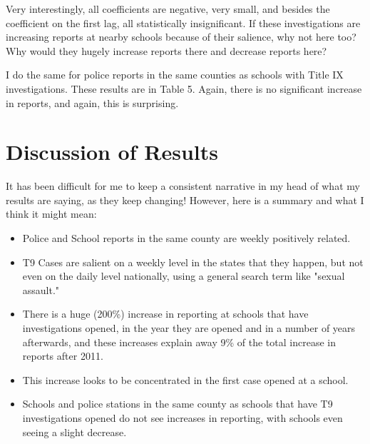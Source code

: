 \documentclass[AER,draftmode]{AEA}
\begin{document}
Very interestingly, all coefficients are negative, very small, and besides the coefficient on the first lag, all statistically insignificant. If these investigations are increasing reports at nearby schools because of their salience, why not here too? Why would they hugely increase reports there and decrease reports here?

I do the same for police reports in the same counties as schools with Title IX investigations. These results are in Table 5. Again, there is no significant increase in reports, and again, this is surprising. 

\section{Discussion of Results}

It has been difficult for me to keep a consistent narrative in my head of what my results are saying, as they keep changing! However, here is a summary and what I think it might mean:

\begin{itemize}
    \item Police and School reports in the same county are weekly positively related.
    \item T9 Cases are salient on a weekly level in the states that they happen, but not even on the daily level nationally, using a general search term like "sexual assault." 
    \item There is a huge (200\%) increase in reporting at schools that have investigations opened, in the year they are opened and in a number of years afterwards, and these increases explain away 9\% of the total increase in reports after 2011.
    \item This increase looks to be concentrated in the first case opened at a school.
    \item Schools and police stations in the same county as schools that have T9 investigations opened do not see increases in reporting, with schools even seeing a slight decrease.
\end{itemize}
\end{document}
